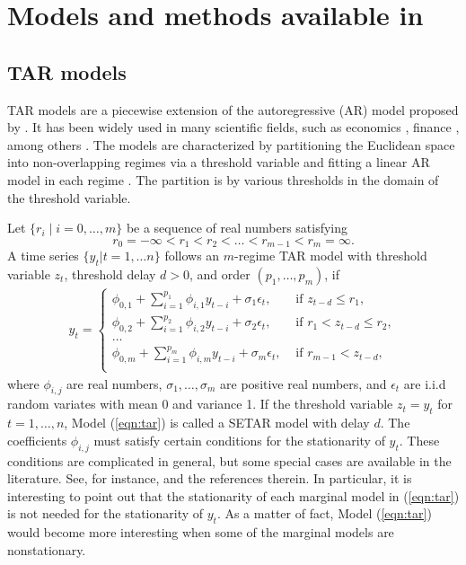 \section{Models and methods available in } \label{sec:models}
\subsection{TAR models}
TAR models are a piecewise extension of the autoregressive (AR) model proposed by \cite{tong1978}. It has been widely used in many scientific fields, such as economics  \citep{tong1980,tiao1989}, finance \citep{domian1997,narayan2006}, among others \citep{chen1995a}.  The models are characterized by partitioning the Euclidean space into non-overlapping regimes
via a threshold variable and fitting a linear AR model in each regime \citep{li2016}. The
partition is by various thresholds in the domain of the threshold variable.

Let $\{ r_i \mid i=0,\ldots,m\}$ be a sequence of real numbers satisfying
\[
r_0=-\infty <r_1<r_2<\ldots <r_{m-1}<r_m=\infty.
\]
A time series $\{y_t| t=1,\ldots n\}$ follows an $m$-regime TAR model with threshold variable $z_t$, threshold delay $d>0$, and order $(p_1,\ldots,p_m)$, if
\begin{align}\label{eqn:tar}
y_t=\left\{
\begin{array}{ll}
\phi_{0,1}+\sum_{i=1}^{p_1} \phi_{i,1}y_{t-i}+\sigma_1 \epsilon_t, &\mbox{ if } z_{t-d} \leq r_1,\\
\phi_{0,2}+\sum_{i=1}^{p_2} \phi_{i,2}y_{t-i}+\sigma_2 \epsilon_t, &\mbox{ if } r_1< z_{t-d} \leq r_2,\\
\ldots\\
\phi_{0,m}+\sum_{i=1}^{p_m} \phi_{i,m}y_{t-i}+\sigma_m \epsilon_t, &\mbox{ if } r_{m-1}<z_{t-d},\\
\end{array}
\right.
\end{align}
where $\phi_{i,j}$ are real numbers, $\sigma_1,\ldots,\sigma_m$ are positive real numbers, and $\epsilon_t$ are i.i.d random variates with mean 0 and variance 1. If the threshold variable $z_t=y_t$ for $t=1,\ldots, n$, Model (\ref{eqn:tar}) is called a SETAR model with delay $d$. The coefficients $\phi_{i,j}$ must satisfy certain conditions for the
stationarity of  $y_t$. These conditions are complicated in general,
but some special cases are available in the
literature. See, for instance, \cite{chen1991} and the references therein. In particular, it is
interesting to point out that the stationarity of each marginal model in (\ref{eqn:tar}) is not
needed for the stationarity of $y_t$. As a matter of fact, Model (\ref{eqn:tar}) would
become more interesting when some of the marginal models are nonstationary.


